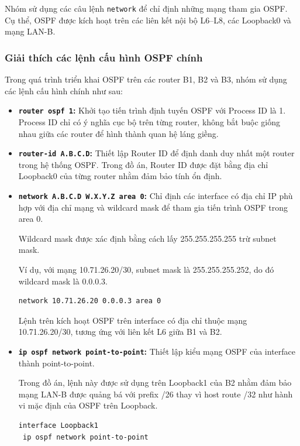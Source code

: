 Nhóm sử dụng các câu lệnh \texttt{network}
để chỉ định những mạng tham gia OSPF.
Cụ thể, OSPF được kích hoạt trên các
liên kết nội bộ L6--L8, các Loopback0
và mạng LAN-B.

\subsubsection{Giải thích các lệnh cấu hình OSPF chính}

Trong quá trình triển khai OSPF trên các router
B1, B2 và B3, nhóm sử dụng các lệnh cấu hình
chính như sau:

\begin{itemize}

    \item \textbf{\texttt{router ospf 1}:}
    Khởi tạo tiến trình định tuyến OSPF với
    Process ID là 1. Process ID chỉ có ý nghĩa
    cục bộ trên từng router, không bắt buộc
    giống nhau giữa các router để hình thành
    quan hệ láng giềng.

    \item \textbf{\texttt{router-id A.B.C.D}:}
    Thiết lập Router ID để định danh duy nhất
    một router trong hệ thống OSPF.
    Trong đồ án, Router ID được đặt bằng
    địa chỉ Loopback0 của từng router nhằm
    đảm bảo tính ổn định.

    \item \textbf{\texttt{network A.B.C.D W.X.Y.Z area 0}:}
    Chỉ định các interface có địa chỉ IP
    phù hợp với địa chỉ mạng và wildcard mask
    để tham gia tiến trình OSPF trong area 0.

    Wildcard mask được xác định bằng cách
    lấy 255.255.255.255 trừ subnet mask.

    Ví dụ, với mạng 10.71.26.20/30,
    subnet mask là 255.255.255.252,
    do đó wildcard mask là 0.0.0.3.

    \begin{lstlisting}
network 10.71.26.20 0.0.0.3 area 0
    \end{lstlisting}

    Lệnh trên kích hoạt OSPF trên interface
    có địa chỉ thuộc mạng 10.71.26.20/30,
    tương ứng với liên kết L6 giữa B1 và B2.

    \item \textbf{\texttt{ip ospf network point-to-point}:}
    Thiết lập kiểu mạng OSPF của interface
    thành point-to-point.

    Trong đồ án, lệnh này được sử dụng
    trên Loopback1 của B2 nhằm đảm bảo
    mạng LAN-B được quảng bá với prefix
    /26 thay vì host route /32 như
    hành vi mặc định của OSPF trên Loopback.

    \begin{lstlisting}
interface Loopback1
 ip ospf network point-to-point
    \end{lstlisting}

\end{itemize}


